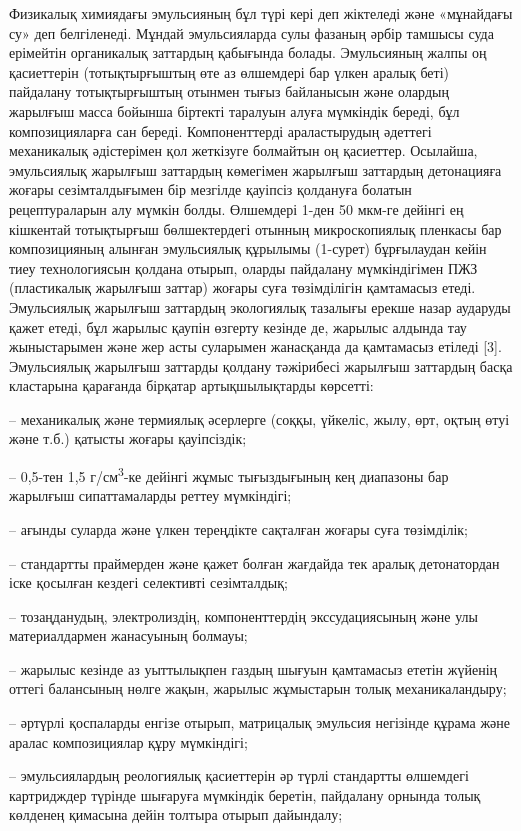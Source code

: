 Физикалық химиядағы эмульсияның бұл түрі кері деп жіктеледі және
«мұнайдағы су» деп белгіленеді. Мұндай эмульсияларда сулы фазаның әрбір
тамшысы суда ерімейтін органикалық заттардың қабығында болады.
Эмульсияның жалпы оң қасиеттерін (тотықтырғыштың өте аз өлшемдері бар
үлкен аралық беті) пайдалану тотықтырғыштың отынмен тығыз байланысын
және олардың жарылғыш масса бойынша біртекті таралуын алуға мүмкіндік
береді, бұл композицияларға сан береді. Компоненттерді араластырудың
әдеттегі механикалық әдістерімен қол жеткізуге болмайтын оң қасиеттер.
Осылайша, эмульсиялық жарылғыш заттардың көмегімен жарылғыш заттардың
детонацияға жоғары сезімталдығымен бір мезгілде қауіпсіз қолдануға
болатын рецептураларын алу мүмкін болды. Өлшемдері 1-ден 50 мкм-ге
дейінгі ең кішкентай тотықтырғыш бөлшектердегі отынның микроскопиялық
пленкасы бар композицияның алынған эмульсиялық құрылымы (1-сурет)
бұрғылаудан кейін тиеу технологиясын қолдана отырып, оларды пайдалану
мүмкіндігімен ПЖЗ (пластикалық жарылғыш заттар) жоғары суға төзімділігін
қамтамасыз етеді. Эмульсиялық жарылғыш заттардың экологиялық тазалығы
ерекше назар аударуды қажет етеді, бұл жарылыс қаупін өзгерту кезінде
де, жарылыс алдында тау жыныстарымен және жер асты суларымен жанасқанда
да қамтамасыз етіледі {[}3{]}. Эмульсиялық жарылғыш заттарды қолдану
тәжірибесі жарылғыш заттардың басқа кластарына қарағанда бірқатар
артықшылықтарды көрсетті:

-- механикалық және термиялық әсерлерге (соққы, үйкеліс, жылу, өрт,
оқтың өтуі және т.б.) қатысты жоғары қауіпсіздік;

-- 0,5-тен 1,5 г/см\textsuperscript{3}-ке дейінгі жұмыс тығыздығының кең
диапазоны бар жарылғыш сипаттамаларды реттеу мүмкіндігі;

-- ағынды суларда және үлкен тереңдікте сақталған жоғары суға
төзімділік;

-- стандартты праймерден және қажет болған жағдайда тек аралық
детонатордан іске қосылған кездегі селективті сезімталдық;

-- тозаңданудың, электролиздің, компоненттердің экссудациясының және улы
материалдармен жанасуының болмауы;

-- жарылыс кезінде аз уыттылықпен газдың шығуын қамтамасыз ететін
жүйенің оттегі балансының нөлге жақын, жарылыс жұмыстарын толық
механикаландыру;

-- әртүрлі қоспаларды енгізе отырып, матрицалық эмульсия негізінде
құрама және аралас композициялар құру мүмкіндігі;

-- эмульсиялардың реологиялық қасиеттерін әр түрлі стандартты өлшемдегі
картридждер түрінде шығаруға мүмкіндік беретін, пайдалану орнында толық
көлденең қимасына дейін толтыра отырып дайындалу;

